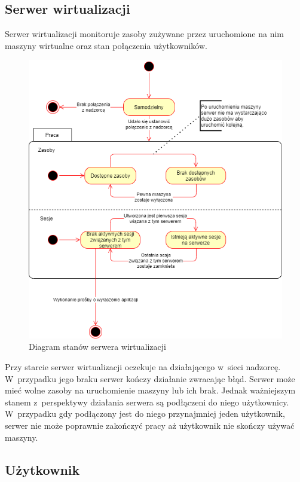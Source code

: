 \documentclass[../opis-rozwiazania.tex]{subfiles}
\begin{document}
\subsection{Serwer wirtualizacji}

Serwer wirtualizacji monitoruje zasoby zużywane przez uruchomione na nim maszyny wirtualne oraz stan połączenia użytkowników.

\begin{figure}[H]
  \centering
  \includegraphics[width=\textwidth]{../diagrams/state_diagrams/virtualisation_server.png}
  \caption{Diagram stanów serwera wirtualizacji}
  \label{state_virtsrv}
\end{figure}

Przy starcie serwer wirtualizacji oczekuje na działającego w~sieci nadzorcę.
W~przypadku jego braku serwer kończy działanie zwracając błąd.
Serwer może mieć wolne zasoby na uruchomienie maszyny lub ich brak.
Jednak ważniejszym stanem z~perspektywy działania serwera są podłączeni do niego użytkownicy.
W~przypadku gdy podłączony jest do niego przynajmniej jeden użytkownik, serwer nie może poprawnie zakończyć pracy aż użytkownik nie skończy używać maszyny.

\subsection{Użytkownik}
\end{document}
